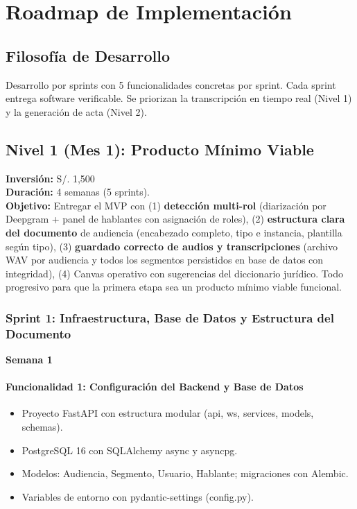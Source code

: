 \documentclass[12pt,a4paper]{report}
\begin{document}
\chapter{Roadmap de Implementación}

\section{Filosofía de Desarrollo}

Desarrollo por sprints con 5 funcionalidades concretas por sprint. Cada sprint entrega software verificable. Se priorizan la transcripción en tiempo real (Nivel 1) y la generación de acta (Nivel 2).

\section{Nivel 1 (Mes 1): Producto Mínimo Viable}

\textbf{Inversión:} S/. 1,500 \\
\textbf{Duración:} 4 semanas (5 sprints). \\
\textbf{Objetivo:} Entregar el MVP con (1) \textbf{detección multi-rol} (diarización por Deepgram + panel de hablantes con asignación de roles), (2) \textbf{estructura clara del documento} de audiencia (encabezado completo, tipo e instancia, plantilla según tipo), (3) \textbf{guardado correcto de audios y transcripciones} (archivo WAV por audiencia y todos los segmentos persistidos en base de datos con integridad), (4) Canvas operativo con sugerencias del diccionario jurídico. Todo progresivo para que la primera etapa sea un producto mínimo viable funcional.

\subsection{Sprint 1: Infraestructura, Base de Datos y Estructura del Documento}

\textbf{Semana 1}

\subsubsection{Funcionalidad 1: Configuración del Backend y Base de Datos}

\begin{itemize}
    \item Proyecto FastAPI con estructura modular (api, ws, services, models, schemas).
    \item PostgreSQL 16 con SQLAlchemy async y asyncpg.
    \item Modelos: Audiencia, Segmento, Usuario, Hablante; migraciones con Alembic.
    \item Variables de entorno con pydantic-settings (config.py).
\end{itemize}
\end{document}
